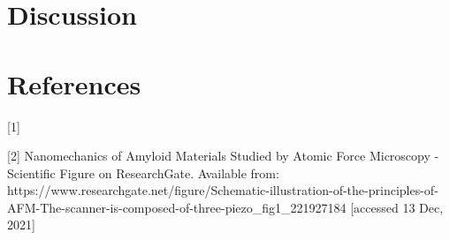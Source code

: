 \documentclass{article}
\begin{document}
\section{Discussion}


\section*{References}

[1] 

[2] Nanomechanics of Amyloid Materials Studied by Atomic Force Microscopy - Scientific Figure on ResearchGate. Available from: https://www.researchgate.net/figure/Schematic-illustration-of-the-principles-of-AFM-The-scanner-is-composed-of-three-piezo_fig1_221927184 [accessed 13 Dec, 2021]
\end{document}
